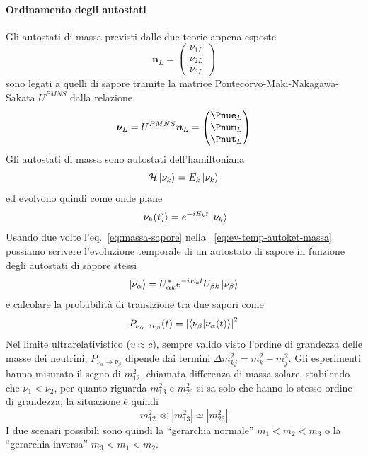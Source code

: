 \documentclass[../../main.tex]{subfiles}
\begin{document}
  \paragraph{Ordinamento degli autostati}
    Gli autostati di massa previsti dalle due teorie appena esposte
    \begin{equation*}
      \bm{n}_L =
      \begin{pmatrix}
        \nu_{1L} \\ \nu_{2L} \\ \nu_{3L}
      \end{pmatrix}
    \end{equation*}
    sono legati a quelli di sapore tramite la matrice
    Pontecorvo-Maki-Nakagawa-Sakata $U^{PMNS}$ dalla relazione
    \begin{equation}
      \bm{\nu}_L = U^{PMNS} \bm{n}_L =
      \begin{pmatrix}
        \Pnue_{L} \\ \Pnum_{L} \\ \Pnut_{L}
      \end{pmatrix}
      \label{eq:massa-sapore}
    \end{equation}
    Gli autostati di massa sono autostati dell'hamiltoniana
    \begin{equation*}
      \mathcal{H} \ket{\nu_k} = E_k \ket{\nu_k}
    \end{equation*}
    ed evolvono quindi come onde piane
    \begin{equation}
      \ket{\nu_k (t)} = e^{-i E_k t} \ket{\nu_k}
      \label{eq:ev-temp-autoket-massa}
    \end{equation}
    Usando due volte l'eq.~\eqref{eq:massa-sapore} nella
    ~\eqref{eq:ev-temp-autoket-massa} possiamo scrivere l'evoluzione temporale
    di un autostato di sapore in funzione degli autostati di sapore stessi
    \begin{equation*}
      \ket{\nu_\alpha} = U^{*}_{\alpha k} e^{-i E_k t} U_{\beta k}
      \ket{\nu_\beta}
    \end{equation*}
    e calcolare la probabilità di transizione tra due sapori come
    \begin{equation*}
      P_{\nu_\alpha \rightarrow \nu_\beta} (t) =
      \left| \braket{\nu_\beta | \nu_\alpha (t)} \right|^2
    \end{equation*}
    Nel limite ultrarelativistico ($v \approx c$), sempre valido visto l'ordine
    di grandezza delle masse dei neutrini,
    $P_{\nu_\alpha \rightarrow \nu_\beta}$ dipende dai termini
    $\Delta m^2_{kj} = m^2_k - m^2_j.$
    Gli esperimenti hanno misurato il segno di $m^2_{12}$, chiamata differenza
    di massa solare, stabilendo che $\nu_1 < \nu_2$, per quanto riguarda
    $m^2_{13}$ e $m^2_{23}$ si sa solo che hanno lo stesso ordine di grandezza;
    la situazione è quindi
    \begin{equation*}
      m^2_{12} \ll \left| m^2_{13} \right| \simeq \left| m^2_{23} \right|
    \end{equation*}
    I due scenari possibili sono quindi la ``gerarchia normale''
    $m_1 < m_2 < m_3$ o la ``gerarchia inversa'' $m_3 < m_1 < m_2.$
\end{document}
